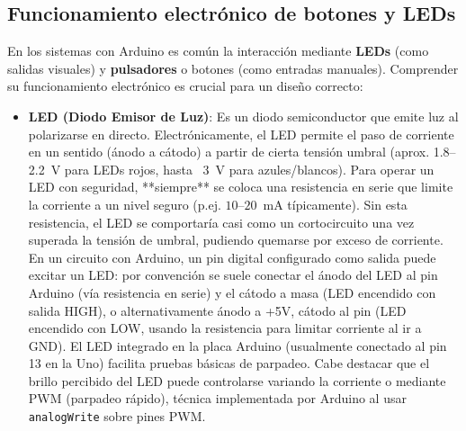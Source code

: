 \documentclass{article}
\begin{document}
\subsection{Funcionamiento electrónico de botones y LEDs}
En los sistemas con Arduino es común la interacción mediante \textbf{LEDs} (como salidas visuales) y \textbf{pulsadores} o botones (como entradas manuales). Comprender su funcionamiento electrónico es crucial para un diseño correcto:
\begin{itemize}
  \item \textbf{LED (Diodo Emisor de Luz)}: Es un diodo semiconductor que emite luz al polarizarse en directo. Electrónicamente, el LED permite el paso de corriente en un sentido (ánodo a cátodo) a partir de cierta tensión umbral (aprox. 1.8–2.2~V para LEDs rojos, hasta ~3 V para azules/blancos). Para operar un LED con seguridad, **siempre** se coloca una resistencia en serie que limite la corriente a un nivel seguro (p.ej. $10$–$20$~mA típicamente).\cite{Horowitz2015} Sin esta resistencia, el LED se comportaría casi como un cortocircuito una vez superada la tensión de umbral, pudiendo quemarse por exceso de corriente. En un circuito con Arduino, un pin digital configurado como salida puede excitar un LED: por convención se suele conectar el ánodo del LED al pin Arduino (vía resistencia en serie) y el cátodo a masa (LED encendido con salida HIGH), o alternativamente ánodo a +5V, cátodo al pin (LED encendido con LOW, usando la resistencia para limitar corriente al ir a GND). El LED integrado en la placa Arduino (usualmente conectado al pin 13 en la Uno) facilita pruebas básicas de parpadeo. Cabe destacar que el brillo percibido del LED puede controlarse variando la corriente o mediante PWM (parpadeo rápido), técnica implementada por Arduino al usar \texttt{analogWrite} sobre pines PWM.

\end{itemize}
\end{document}
